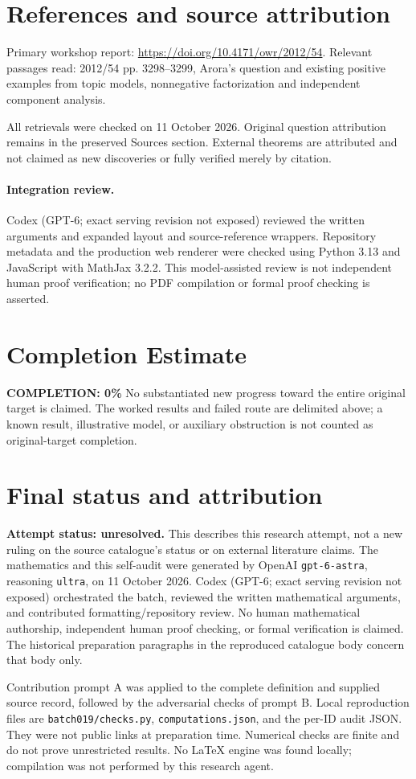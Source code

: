 \documentclass[11pt]{article}
\begin{document}
\section{References and source attribution}
Primary workshop report: \url{https://doi.org/10.4171/owr/2012/54}. Relevant passages read: 2012/54 pp. 3298--3299, Arora’s question and existing positive examples from topic models, nonnegative factorization and independent component analysis.

All retrievals were checked on 11 October 2026. Original question attribution remains in the preserved Sources section. External theorems are attributed and not claimed as new discoveries or fully verified merely by citation.


\paragraph{Integration review.} Codex (GPT-6; exact serving revision not exposed) reviewed the written arguments and expanded layout and source-reference wrappers. Repository metadata and the production web renderer were checked using Python 3.13 and JavaScript with MathJax 3.2.2. This model-assisted review is not independent human proof verification; no PDF compilation or formal proof checking is asserted.

\section{Completion Estimate}
\noindent\textbf{COMPLETION: 0\%}
No substantiated new progress toward the entire original target is claimed. The worked results and failed route are delimited above; a known result, illustrative model, or auxiliary obstruction is not counted as original-target completion.

\section{Final status and attribution}
\textbf{Attempt status: unresolved.} This describes this research attempt, not a new ruling on the source catalogue's status or on external literature claims.
The mathematics and this self-audit were generated by OpenAI \texttt{gpt-6-astra}, reasoning \texttt{ultra}, on 11 October 2026. Codex (GPT-6; exact serving revision not exposed) orchestrated the batch, reviewed the written mathematical arguments, and contributed formatting/repository review. No human mathematical authorship, independent human proof checking, or formal verification is claimed. The historical preparation paragraphs in the reproduced catalogue body concern that body only.

Contribution prompt A was applied to the complete definition and supplied source record, followed by the adversarial checks of prompt B. Local reproduction files are \texttt{batch019/checks.py}, \texttt{computations.json}, and the per-ID audit JSON. They were not public links at preparation time. Numerical checks are finite and do not prove unrestricted results. No LaTeX engine was found locally; compilation was not performed by this research agent.
\end{document}
